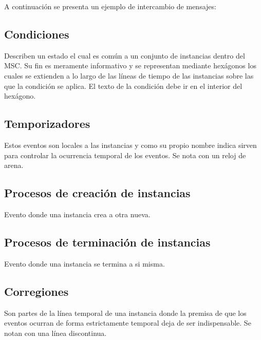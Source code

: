 A continuación se presenta un ejemplo de intercambio de mensajes:

\subsection*{Condiciones}
Describen un estado el cual es común a un conjunto de instancias
dentro del MSC. Su fin es meramente informativo y se representan
mediante hexágonos los cuales se extienden a lo largo de las líneas de
tiempo de las instancias sobre las que la condición se aplica. El
texto de la condición debe ir en el interior del hexágono.


\subsection*{Temporizadores}
Estos eventos son locales a las instancias y como su propio nombre
indica sirven para controlar la ocurrencia temporal de los eventos. Se
nota con un reloj de arena.


\subsection*{Procesos de creación de instancias} 
Evento donde una instancia crea a otra nueva.
\subsection*{Procesos de terminación de instancias}
Evento donde una instancia se termina a si misma.
\subsection*{Corregiones}
Son partes de la línea temporal de una instancia donde la premisa de
que los eventos ocurran de forma estrictamente temporal deja de ser
indispensable. Se notan con una línea discontinua.

